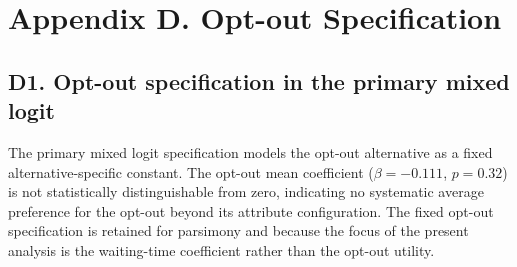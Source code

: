 \section*{Appendix D. Opt-out Specification}
\label{app:D}

\subsection*{D1. Opt-out specification in the primary mixed logit}

The primary mixed logit specification models the opt-out alternative as a fixed alternative-specific constant. The opt-out mean coefficient ($\beta = -0.111$, $p = 0.32$) is not statistically distinguishable from zero, indicating no systematic average preference for the opt-out beyond its attribute configuration. The fixed opt-out specification is retained for parsimony and because the focus of the present analysis is the waiting-time coefficient rather than the opt-out utility.


